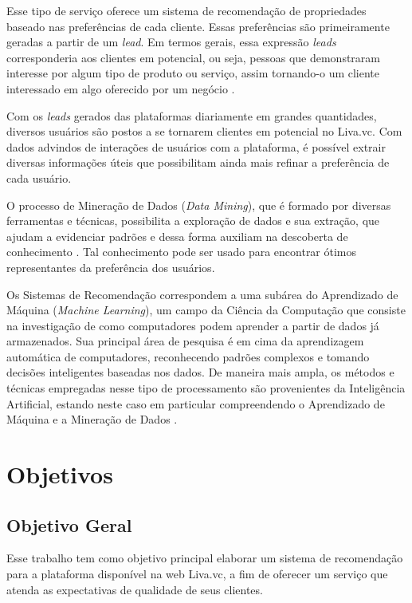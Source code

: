 Esse tipo de serviço oferece um sistema de recomendação de propriedades baseado nas preferências de cada cliente. Essas preferências são primeiramente geradas a partir de um \textit{lead}. Em termos gerais, essa expressão \textit{leads} corresponderia aos clientes em potencial, ou seja, pessoas que demonstraram interesse por algum tipo de produto ou serviço, assim tornando-o um cliente interessado em algo oferecido por um negócio \cite{Agenciakaizen:2019}.

Com os \textit{leads} gerados das plataformas diariamente em grandes quantidades, diversos usuários são postos a se tornarem clientes em potencial no Liva.vc. Com dados advindos de interações de usuários com a plataforma, é possível extrair diversas informações úteis que possibilitam ainda mais refinar a preferência de cada usuário.

O processo de Mineração de Dados (\textit{Data Mining}), que é formado por diversas ferramentas e técnicas, possibilita a exploração de dados e sua extração, que ajudam a evidenciar padrões e dessa forma auxiliam na descoberta de conhecimento \cite{Han:2011:DMC:1972541}. Tal conhecimento pode ser usado para encontrar ótimos representantes da preferência dos usuários.

Os Sistemas de Recomendação correspondem a uma subárea do Aprendizado de Máquina (\textit{Machine Learning}), um campo da Ciência da Computação que consiste na investigação de como computadores podem aprender a partir de dados já armazenados. Sua principal área de pesquisa é em cima da aprendizagem automática de computadores, reconhecendo padrões complexos e tomando decisões inteligentes baseadas nos dados. De maneira mais ampla, os métodos e técnicas empregadas nesse tipo de processamento são provenientes da Inteligência Artificial, estando neste caso em particular compreendendo o Aprendizado de Máquina e a Mineração de Dados \cite{Han:2011:DMC:1972541}.

\section{Objetivos}
\label{section:objetivos}

\subsection{Objetivo Geral}

Esse trabalho tem como objetivo principal elaborar um sistema de recomendação para a plataforma disponível na web Liva.vc, a fim de oferecer um serviço que atenda as expectativas de qualidade de seus clientes.

